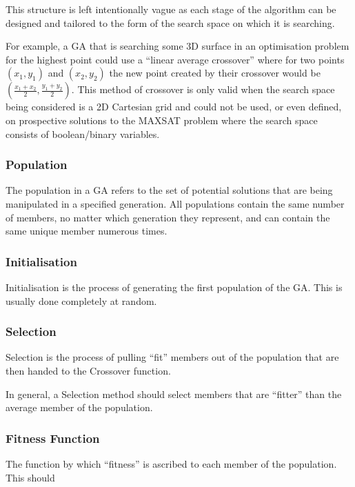 This structure is left intentionally vague as each stage of the algorithm can be designed and tailored to the form of the search space on which it is searching. \newline

For example, a GA that is searching some 3D surface in an optimisation problem for the highest point could use a ``linear average crossover'' where for two points $(x_{1}, y_{1})$ and $(x_{2}, y_{2})$ the new point created by their crossover would be $(\frac{x_{1} + x_{2}}{2}, \frac{y_{1} + y_{2}}{2})$. This method of crossover is only valid when the search space being considered is a 2D Cartesian grid and could not be used, or even defined, on prospective solutions to the MAXSAT problem where the search space consists of boolean/binary variables.

\subsubsection{Population} \label{Population}
The population in a GA refers to the set of potential solutions that are being manipulated in a specified generation. All populations contain the same number of members, no matter which generation they represent, and can contain the same unique member numerous times.

\subsubsection{Initialisation} \label{Initialisation}
Initialisation is the process of generating the first population of the GA. This is usually done completely at random.

\subsubsection{Selection} \label{Selection}
Selection is the process of pulling ``fit'' members out of the population that are then handed to the Crossover function. \newline

In general, a Selection method should select members that are ``fitter'' than the average member of the population.

\subsubsection{Fitness Function} \label{Fitness}
The function by which ``fitness'' is ascribed to each member of the population. This should 

